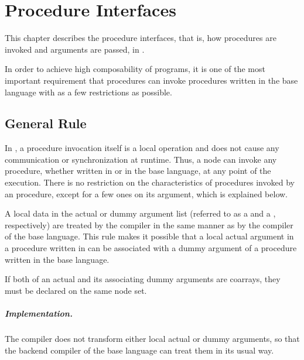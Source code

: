 \chapter{Procedure Interfaces}
\label{chap:procedure}

This chapter describes the procedure interfaces, that is, how
procedures are invoked and arguments are passed, in {\XMP}.

In order to achieve high composability of {\XMP} programs, it is one of
the most important requirement that {\XMP} procedures can invoke
procedures written in the base language with as a few restrictions as
possible.


\section{General Rule}

In {\XMP}, a procedure invocation itself is a local operation and does
not cause any communication or synchronization at runtime. Thus, a node
can invoke any procedure, whether written in {\XMP} or in the base
language, at any point of the execution.
%
There is no restriction on the characteristics of procedures invoked by
an {\XMP} procedure, except for a few ones on its argument, which is
explained below.

A local data in the actual or dummy argument list (referred to as a {\it
{}} and a {\it {}},
respectively) are treated by the {\XMP} compiler in the same manner as
by the compiler of the base language.
%
This rule makes it possible that a local actual argument in a procedure
written in {\XMP} can be associated with a dummy argument of a procedure
written in the base language.

If both of an actual and its associating dummy arguments are coarrays,
they must be declared on the same node set.


\paragraph*{Implementation.}

The {\XMP} compiler does not transform either local actual or dummy
arguments, so that the backend compiler of the base language can treat
them in its usual way.

